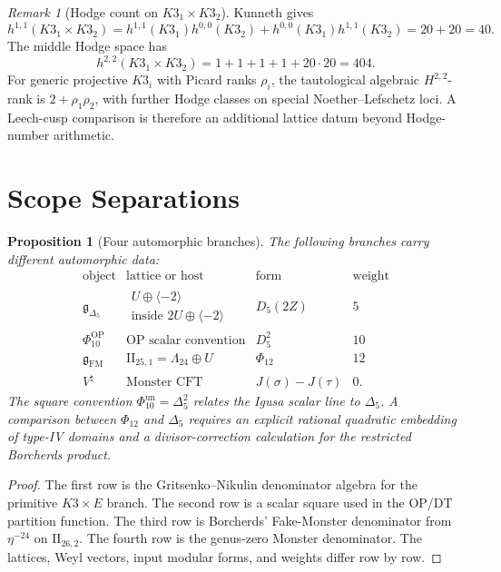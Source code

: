 \documentclass[11pt]{amsart}
\newtheorem{proposition}[theorem]{Proposition}
\theoremstyle{definition}
\theoremstyle{remark}
\newtheorem{remark}[theorem]{Remark}
\providecommand{\Leech}{\Lambda_{24}}
\providecommand{\IIlor}{\mathrm{II}_{25,1}}
\providecommand{\IIpar}{\mathrm{II}_{26,2}}
\providecommand{\PhiFM}{\Phi_{12}}
\providecommand{\gFM}{\mathfrak{g}_{\mathrm{FM}}}
\providecommand{\gDelta}{\mathfrak{g}_{\Delta_5}}
\begin{document}
\begin{remark}[Hodge count on \(K3_1\times K3_2\)]
Kunneth gives
\[
 h^{1,1}(K3_1\times K3_2)
 =
 h^{1,1}(K3_1)h^{0,0}(K3_2)
 +
 h^{0,0}(K3_1)h^{1,1}(K3_2)
 =
 20+20=40 .
\]
The middle Hodge space has
\[
 h^{2,2}(K3_1\times K3_2)
 =
 1+1+1+1+20\cdot20
 =
 404.
\]
For generic projective \(K3_i\) with Picard ranks \(\rho_i\), the
tautological algebraic \(H^{2,2}\)-rank is \(2+\rho_1\rho_2\), with
further Hodge classes on special Noether--Lefschetz loci. A
Leech-cusp comparison is therefore an additional lattice datum beyond
Hodge-number arithmetic.
\end{remark}

\section{Scope Separations}

\begin{proposition}[Four automorphic branches]
\label{prop:four-denominator-branches}
The following branches carry different automorphic data:
\[
\begin{array}{c|c|c|c}
\text{object} & \text{lattice or host} & \text{form} & \text{weight}\\
\hline
\gDelta &
\begin{array}{c}
U\oplus\langle -2\rangle\\
\text{inside }2U\oplus\langle -2\rangle
\end{array}
& D_5(2Z) & 5\\
\Phi_{10}^{\mathrm{OP}} & \text{OP scalar convention} & D_5^2 & 10\\
\gFM & \IIlor=\Leech\oplus U & \PhiFM & 12\\
V^\natural & \text{Monster CFT} & J(\sigma)-J(\tau) & 0 .
\end{array}
\]
The square convention \(\Phi_{10}^{\mathrm{un}}=\Delta_5^2\) relates the
Igusa scalar line to \(\Delta_5\). A comparison between \(\PhiFM\) and
\(\Delta_5\) requires an explicit rational quadratic embedding of type-IV
domains and a divisor-correction calculation for the restricted
Borcherds product.
\end{proposition}

\begin{proof}
The first row is the Gritsenko--Nikulin denominator algebra for the
primitive \(K3\times E\) branch. The second row is a scalar square used
in the OP/DT partition function. The third row is Borcherds'
Fake-Monster denominator from \(\eta^{-24}\) on \(\IIpar\). The fourth
row is the genus-zero Monster denominator. The lattices, Weyl vectors,
input modular forms, and weights differ row by row.
\end{proof}
\end{document}
